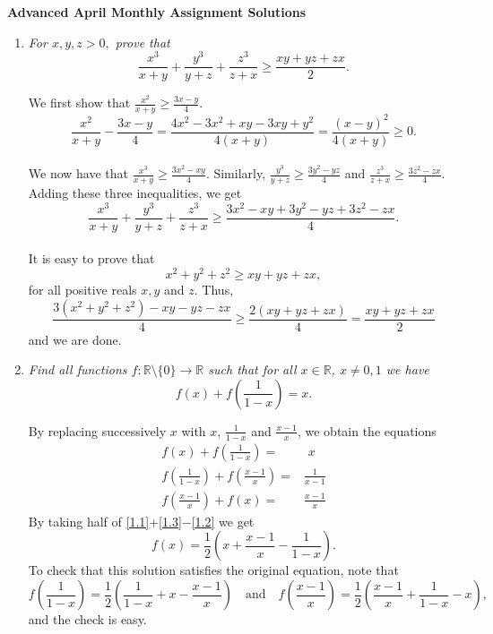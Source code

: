 \documentclass{article}
\begin{document}
\thispagestyle{empty}

\begin{center}
  \textbf{\Large Advanced April Monthly Assignment Solutions}
\end{center}

\vspace{12pt}

\begin{enumerate}[1.]

\vspace{24pt}
\item %
{\itshape For $x,y,z >0,$ prove that $$\frac{x^3}{x+y}+\frac{y^3}{y+z} + \frac{z^3}{z+x} \geq \frac{xy+yz+zx}{2}.$$}


We first show that $\displaystyle\frac{x^2}{x+y} \geq \frac{3x-y}{4}.$ $$\frac{x^2}{x+y}-\frac{3x-y}{4} = \frac{4x^2 - 3x^2 + xy - 3xy + y^2}{4(x+y)} = \frac{(x-y)^2}{4(x+y)} \geq 0.$$ \\ We now have that $\displaystyle \frac{x^3}{x+y} \geq \frac{3x^2-xy}{4}.$ Similarly, $\displaystyle\frac{y^3}{y+z} \geq \frac{3y^2-yz}{4}$ and $\displaystyle\frac{z^3}{z+x} \geq \frac{3z^2-zx}{4}.$ Adding these three inequalities, we get $$\displaystyle\frac{x^3}{x+y} + \frac{y^3}{y+z} + \frac{z^3}{z+x} \geq \frac{3x^2 - xy + 3y^2 - yz + 3z^2 - zx}{4}.$$\\
It is easy to prove that $$x^2 + y^2 + z^2 \geq xy + yz + zx,$$ for all positive reals $x,y$ and $z$. Thus, $$\frac{3(x^2 + y^2 + z^2) - xy -yz -zx}{4} \geq \frac{2(xy+yz+zx)}{4} = \frac{xy+yz+zx}{2}$$ and we are done.


\vspace{24pt}
\item %
{\itshape Find all functions $f:\mathbb{R}\setminus\{0\}\to\mathbb{R}$ such that for all $x\in\mathbb{R}$, $x\ne 0,1$ we have
	$$f(x)+f\left(\frac{1}{1-x}\right)=x.$$}

By replacing successively $x$ with $x$, $\frac{1}{1-x}$ and $\frac{x-1}{x}$, we obtain the equations
	\begin{align}
	  f(x)+f\left(\frac{1}{1-x}\right)=&\,\,x\label{1.1}\\
		f\left(\frac{1}{1-x}\right)+f\left(\frac{x-1}{x}\right)=&\frac{1}{x-1}\label{1.2}\\
		f\left(\frac{x-1}{x}\right)+f(x)=&\frac{x-1}{x}\label{1.3}
	\end{align}
	By taking half of \eqref{1.1}+\eqref{1.3}$-$\eqref{1.2} we get
	$$f(x)=\frac{1}{2}\left(x+\frac{x-1}{x}-\frac{1}{1-x}\right).$$
	To check that this solution satisfies the original equation, note that
	$$f\left(\frac{1}{1-x}\right)=\frac{1}{2}\left(\frac{1}{1-x}+x-\frac{x-1}{x}\right)\quad\text{and}\quad f\left(\frac{x-1}{x}\right)=\frac{1}{2}\left(\frac{x-1}{x}+\frac{1}{1-x}-x\right),$$
	and the check is easy.



\end{enumerate}
\end{document}
